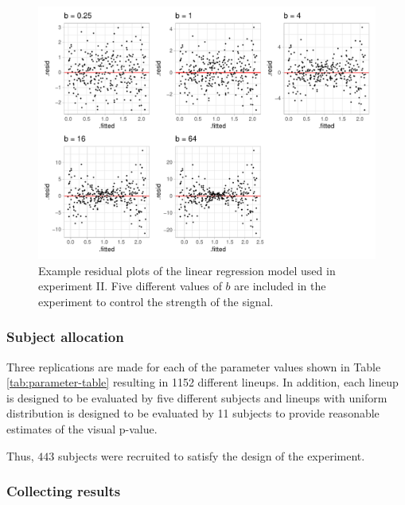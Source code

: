 \documentclass[]{interact}
\theoremstyle{plain}%
\theoremstyle{definition}
\theoremstyle{remark}
\begin{document}
\begin{figure}

{\centering \includegraphics[width=1\linewidth]{paper_comparison_files/figure-latex/different-b-1} 

}

\caption{Example residual plots of the linear regression model used in experiment II. Five different values of $b$ are included in the experiment to control the strength of the signal.}\label{fig:different-b}
\end{figure}

\hypertarget{subject-allocation}{%
\subsubsection{Subject allocation}\label{subject-allocation}}

Three replications are made for each of the parameter values shown in
Table \ref{tab:parameter-table} resulting in 1152 different lineups. In
addition, each lineup is designed to be evaluated by five different
subjects and lineups with uniform distribution is designed to be
evaluated by 11 subjects to provide reasonable estimates of the visual
p-value.

Thus, \(443\) subjects were recruited to satisfy the design of the
experiment.

\hypertarget{collecting-results}{%
\subsubsection{Collecting results}\label{collecting-results}}
\end{document}
